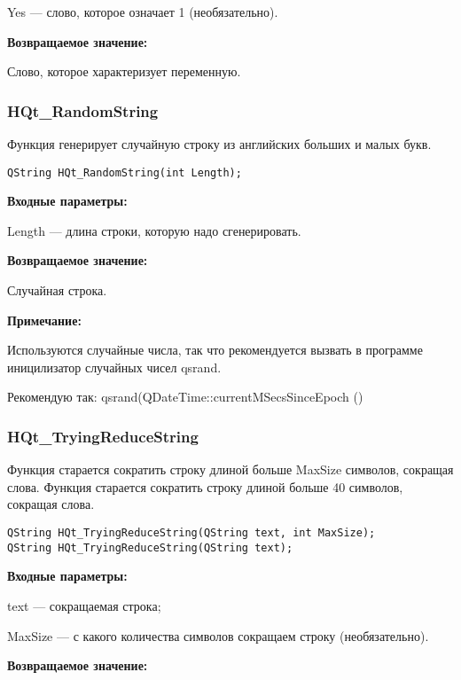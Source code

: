 \documentclass[a4paper,12pt]{article}
\begin{document}
    Yes --- слово, которое означает 1 (необязательно).

\textbf{Возвращаемое значение:}

Слово, которое характеризует переменную.


\subsubsection{HQt\_RandomString}\label{HQt_RandomString}

Функция генерирует случайную строку из английских больших и малых букв.


\begin{lstlisting}[label=code_syntax_HQt_RandomString,caption=Синтаксис]
QString HQt_RandomString(int Length);
\end{lstlisting}

\textbf{Входные параметры:}

Length --- длина строки, которую надо сгенерировать.

\textbf{Возвращаемое значение:}

Случайная строка.

\textbf{Примечание:}

Используются случайные числа, так что рекомендуется вызвать в программе иницилизатор случайных чисел qsrand.

Рекомендую так: qsrand(QDateTime::currentMSecsSinceEpoch () %


\subsubsection{HQt\_TryingReduceString}\label{HQt_TryingReduceString}

Функция старается сократить строку длиной больше MaxSize символов, сокращая слова. Функция старается сократить строку длиной больше 40 символов, сокращая слова.


\begin{lstlisting}[label=code_syntax_HQt_TryingReduceString,caption=Синтаксис]
QString HQt_TryingReduceString(QString text, int MaxSize);
QString HQt_TryingReduceString(QString text);
\end{lstlisting}

\textbf{Входные параметры:}

text --- сокращаемая строка;
 
	MaxSize --- с какого количества символов сокращаем строку (необязательно).

\textbf{Возвращаемое значение:}
\end{document}
